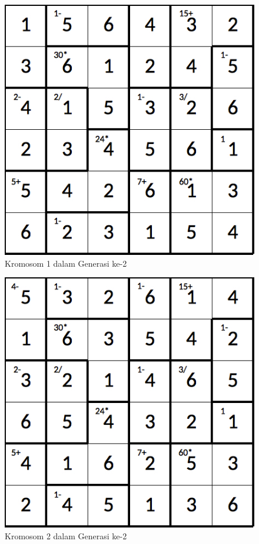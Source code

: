 \clearpage

\begin{figure}
\centering
\captionsetup{justification=centering}
\includegraphics[scale=0.333]{Gambar/hybridgenetic/Generation2Chromosome1}
\caption[Kromosom 1 dalam Generasi ke-2]{Kromosom 1 dalam Generasi ke-2}
\label{fig:analisisg2k1}
\end{figure}

\begin{figure}
\centering
\captionsetup{justification=centering}
\includegraphics[scale=0.333]{Gambar/hybridgenetic/Generation2Chromosome2}
\caption[Kromosom 2 dalam Generasi ke-2]{Kromosom 2 dalam Generasi ke-2}
\label{fig:analisisg2k2}
\end{figure}


